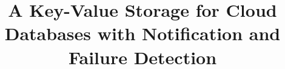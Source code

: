 \documentclass{sig-alternate}
\begin{document}
%
\title{A Key-Value Storage for Cloud Databases with Notification and Failure Detection}%
%
%
%
%
%
\end{document}
